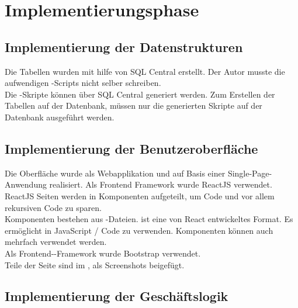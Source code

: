 \section{Implementierungsphase} 
\label{sec:Implementierungsphase}

\subsection{Implementierung der Datenstrukturen}
\label{sec:ImplementierungDatenstrukturen}

Die Tabellen wurden mit hilfe von SQL Central erstellt. Der Autor musste die aufwendigen -Scripts nicht selber schreiben. \\
Die -Skripte können über SQL Central generiert werden. Zum Erstellen der Tabellen auf der Datenbank, müssen nur die generierten Skripte auf der Datenbank ausgeführt werden. 


\subsection{Implementierung der Benutzeroberfläche}
\label{sec:ImplementierungBenutzeroberflaeche}

Die Oberfläche wurde als Webapplikation und auf Basis einer Single-Page-Anwendung realisiert. Als Frontend Framework wurde ReactJS verwendet. \\
ReactJS Seiten werden in Komponenten aufgeteilt, um Code und vor allem rekursiven Code zu sparen. \\
Komponenten bestehen aus -Dateien.  ist eine von React entwickeltes Format. Es ermöglicht in JavaScript / Code zu verwenden. Komponenten können auch mehrfach verwendet werden.\\
Als Frontend--Framework wurde Bootstrap verwendet. \\
Teile der Seite sind im , als Screenshots beigefügt.


\subsection{Implementierung der Geschäftslogik}
\label{sec:ImplementierungGeschaeftslogik}

